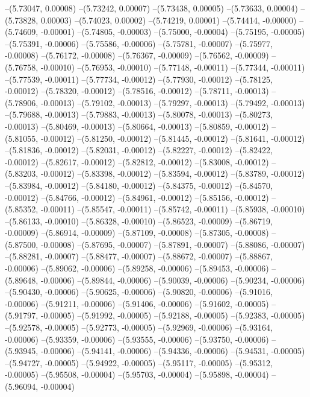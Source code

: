 --(5.73047, 0.00008)
--(5.73242, 0.00007)
--(5.73438, 0.00005)
--(5.73633, 0.00004)
--(5.73828, 0.00003)
--(5.74023, 0.00002)
--(5.74219, 0.00001)
--(5.74414, -0.00000)
--(5.74609, -0.00001)
--(5.74805, -0.00003)
--(5.75000, -0.00004)
--(5.75195, -0.00005)
--(5.75391, -0.00006)
--(5.75586, -0.00006)
--(5.75781, -0.00007)
--(5.75977, -0.00008)
--(5.76172, -0.00008)
--(5.76367, -0.00009)
--(5.76562, -0.00009)
--(5.76758, -0.00010)
--(5.76953, -0.00010)
--(5.77148, -0.00011)
--(5.77344, -0.00011)
--(5.77539, -0.00011)
--(5.77734, -0.00012)
--(5.77930, -0.00012)
--(5.78125, -0.00012)
--(5.78320, -0.00012)
--(5.78516, -0.00012)
--(5.78711, -0.00013)
--(5.78906, -0.00013)
--(5.79102, -0.00013)
--(5.79297, -0.00013)
--(5.79492, -0.00013)
--(5.79688, -0.00013)
--(5.79883, -0.00013)
--(5.80078, -0.00013)
--(5.80273, -0.00013)
--(5.80469, -0.00013)
--(5.80664, -0.00013)
--(5.80859, -0.00012)
--(5.81055, -0.00012)
--(5.81250, -0.00012)
--(5.81445, -0.00012)
--(5.81641, -0.00012)
--(5.81836, -0.00012)
--(5.82031, -0.00012)
--(5.82227, -0.00012)
--(5.82422, -0.00012)
--(5.82617, -0.00012)
--(5.82812, -0.00012)
--(5.83008, -0.00012)
--(5.83203, -0.00012)
--(5.83398, -0.00012)
--(5.83594, -0.00012)
--(5.83789, -0.00012)
--(5.83984, -0.00012)
--(5.84180, -0.00012)
--(5.84375, -0.00012)
--(5.84570, -0.00012)
--(5.84766, -0.00012)
--(5.84961, -0.00012)
--(5.85156, -0.00012)
--(5.85352, -0.00011)
--(5.85547, -0.00011)
--(5.85742, -0.00011)
--(5.85938, -0.00010)
--(5.86133, -0.00010)
--(5.86328, -0.00010)
--(5.86523, -0.00009)
--(5.86719, -0.00009)
--(5.86914, -0.00009)
--(5.87109, -0.00008)
--(5.87305, -0.00008)
--(5.87500, -0.00008)
--(5.87695, -0.00007)
--(5.87891, -0.00007)
--(5.88086, -0.00007)
--(5.88281, -0.00007)
--(5.88477, -0.00007)
--(5.88672, -0.00007)
--(5.88867, -0.00006)
--(5.89062, -0.00006)
--(5.89258, -0.00006)
--(5.89453, -0.00006)
--(5.89648, -0.00006)
--(5.89844, -0.00006)
--(5.90039, -0.00006)
--(5.90234, -0.00006)
--(5.90430, -0.00006)
--(5.90625, -0.00006)
--(5.90820, -0.00006)
--(5.91016, -0.00006)
--(5.91211, -0.00006)
--(5.91406, -0.00006)
--(5.91602, -0.00005)
--(5.91797, -0.00005)
--(5.91992, -0.00005)
--(5.92188, -0.00005)
--(5.92383, -0.00005)
--(5.92578, -0.00005)
--(5.92773, -0.00005)
--(5.92969, -0.00006)
--(5.93164, -0.00006)
--(5.93359, -0.00006)
--(5.93555, -0.00006)
--(5.93750, -0.00006)
--(5.93945, -0.00006)
--(5.94141, -0.00006)
--(5.94336, -0.00006)
--(5.94531, -0.00005)
--(5.94727, -0.00005)
--(5.94922, -0.00005)
--(5.95117, -0.00005)
--(5.95312, -0.00005)
--(5.95508, -0.00004)
--(5.95703, -0.00004)
--(5.95898, -0.00004)
--(5.96094, -0.00004)
